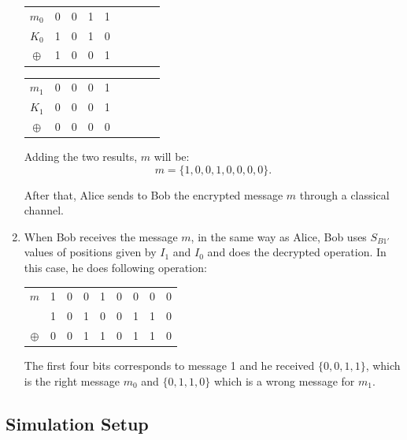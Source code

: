 \begin{enumerate}
   \begin{table}[H]
    \centering
    \begin{tabular}{c|c c c c c c c c}
     $m_{0}$ & 0 & 0 & 1 & 1 \\
     $K_{0}$ & 1 & 0 & 1 & 0 \\ \hline
     $\oplus$ & 1 & 0 & 0 & 1
    \end{tabular}
    \end{table}

   \begin{table}[H]
    \centering
    \begin{tabular}{c|c c c c c c c c}
     $m_{1}$ & 0 & 0 & 0 & 1 \\
     $K_{1}$ & 0 & 0 & 0 & 1 \\ \hline
     $\oplus$ & 0 & 0 & 0 & 0
    \end{tabular}
    \end{table}

    Adding the two results, $m$ will be: $$m=\{1,0,0,1,0,0,0,0\}.$$

   After that, Alice sends to Bob the encrypted message $m$ through a classical channel.

  \item When Bob receives the message $m$, in the same way as Alice, Bob uses $S_{B1\prime}$ values of positions given by $I_{1}$ and $I_{0}$ and does the decrypted operation. In this case, he does following operation:

      \begin{table}[H]
        \centering
        \begin{tabular}{c|c c c c c c c c}
         $m$ & 1 & 0 & 0 & 1 & 0 & 0 & 0 & 0 \\
             & 1 & 0 & 1 & 0 & 0 & 1 & 1 & 0 \\ \hline
         $\oplus$ & 0 & 0 & 1 & 1 & 0 & 1 & 1 & 0 \\
        \end{tabular}
        \end{table}

      The first four bits corresponds to message 1 and he received $\{0,0,1,1\}$, which is the right message $m_{0}$ and $\{0,1,1,0\}$ which is a wrong message for $m_{1}$.


\end{enumerate}

\subsection{Simulation Setup}



